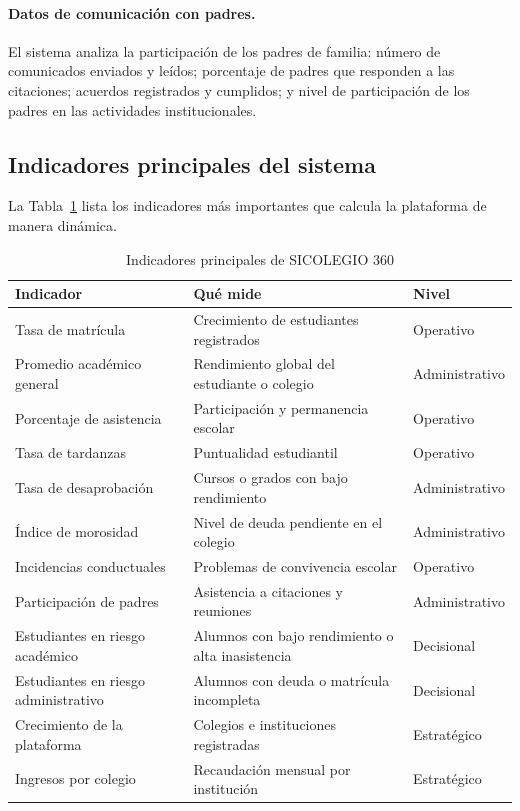 \documentclass[12pt,a4paper,oneside]{report}
\begin{document}
\paragraph{Datos de comunicación con padres.} El sistema analiza la participación de los padres de familia: número de comunicados enviados y leídos; porcentaje de padres que responden a las citaciones; acuerdos registrados y cumplidos; y nivel de participación de los padres en las actividades institucionales.

\subsection{Indicadores principales del sistema}
La Tabla~\ref{tab:indicadores} lista los indicadores más importantes que calcula la plataforma de manera dinámica.

\begin{table}[H]
\centering
\caption{Indicadores principales de SICOLEGIO 360}
\label{tab:indicadores}
\begin{tabularx}{\textwidth}{lXl}
\toprule
Indicador & Qué mide & Nivel \\
\midrule
Tasa de matrícula & Crecimiento de estudiantes registrados & Operativo \\
Promedio académico general & Rendimiento global del estudiante o colegio & Administrativo \\
Porcentaje de asistencia & Participación y permanencia escolar & Operativo \\
Tasa de tardanzas & Puntualidad estudiantil & Operativo \\
Tasa de desaprobación & Cursos o grados con bajo rendimiento & Administrativo \\
Índice de morosidad & Nivel de deuda pendiente en el colegio & Administrativo \\
Incidencias conductuales & Problemas de convivencia escolar & Operativo \\
Participación de padres & Asistencia a citaciones y reuniones & Administrativo \\
Estudiantes en riesgo académico & Alumnos con bajo rendimiento o alta inasistencia & Decisional \\
Estudiantes en riesgo administrativo & Alumnos con deuda o matrícula incompleta & Decisional \\
Crecimiento de la plataforma & Colegios e instituciones registradas & Estratégico \\
Ingresos por colegio & Recaudación mensual por institución & Estratégico \\
\bottomrule
\end{tabularx}
\end{table}
\end{document}

